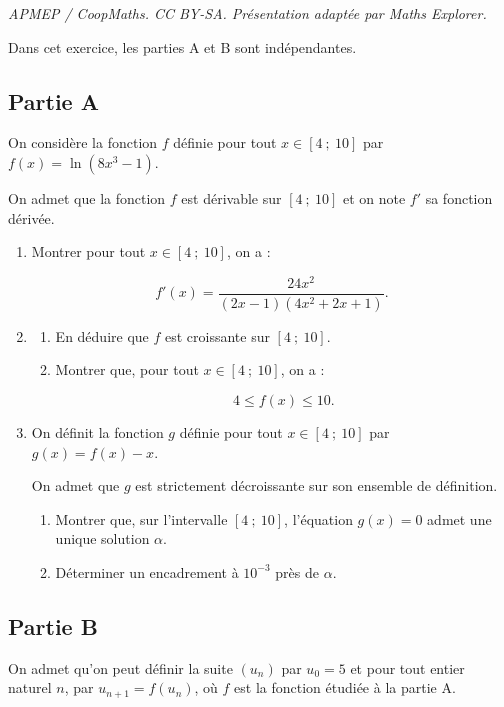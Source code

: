 \documentclass[10pt]{article}
\begin{document}
\noindent\textit{APMEP / CoopMaths. CC BY-SA. Présentation adaptée par Maths Explorer.}\par\medskip
Dans cet exercice, les parties A et B sont indépendantes.

\subsection*{Partie A}

On considère la fonction $f$ définie pour tout $x \in [4~;~10]$ par $f(x) = \ln(8x^3 - 1)$.

On admet que la fonction $f$ est dérivable sur $[4~;~10]$ et on note $f'$ sa fonction dérivée.

\medskip

\begin{enumerate}
\item Montrer pour tout $x \in [4~;~10]$, on a :

\[f'(x) = \frac{24x^2}{(2x-1)(4x^2+2x+1)}.\]

\item[2.] 
	\begin{enumerate}[label=\alph*.]
		\item En déduire que $f$ est croissante sur $[4~;~10]$.
		\item Montrer que, pour tout $x \in [4~;~10]$, on a :

\[4 \leqslant f(x) \leqslant 10.\]

	\end{enumerate}
\item[3.] On définit la fonction $g$ définie pour tout $x \in [4~;~10]$ par $g(x) = f(x) - x$.

On admet que $g$ est strictement décroissante sur son ensemble de définition.

\medskip

\begin{enumerate}[label=\alph*.]
\item Montrer que, sur l'intervalle $[4~;~10]$, l'équation $g(x) = 0$ admet une unique solution $\alpha$.
\item Déterminer un encadrement à $10^{-3}$ près de $\alpha$.
    \end{enumerate}
\end{enumerate}

\subsection*{Partie B}

On admet qu'on peut définir la suite $(u_n)$ par $u_0 = 5$ et pour tout entier naturel $n$, par $u_{n+1} = f(u_n)$, où $f$ est la fonction étudiée à la partie A.
\end{document}
